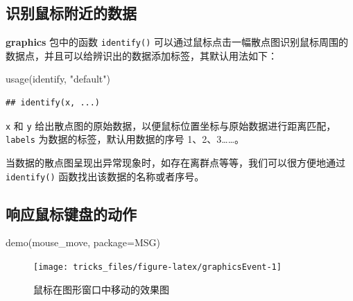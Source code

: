 \documentclass[
  b5paper,
  UTF8,twoside]{book}
\newenvironment{Shaded}{\begin{snugshade}}{\end{snugshade}}
\newcommand{\AttributeTok}[1]{\textcolor[rgb]{0.77,0.63,0.00}{#1}}
\newcommand{\FunctionTok}[1]{\textcolor[rgb]{0.00,0.00,0.00}{#1}}
\newcommand{\NormalTok}[1]{#1}
\newcommand{\StringTok}[1]{\textcolor[rgb]{0.31,0.60,0.02}{#1}}
\begin{document}
\hypertarget{ux8bc6ux522bux9f20ux6807ux9644ux8fd1ux7684ux6570ux636e}{%
\subsection{识别鼠标附近的数据}\label{ux8bc6ux522bux9f20ux6807ux9644ux8fd1ux7684ux6570ux636e}}

\textbf{graphics} 包中的函数 \texttt{identify()} 可以通过鼠标点击一幅散点图识别鼠标周围的数据点，并且可以给辨识出的数据添加标签，其默认用法如下：

\begin{Shaded}
\begin{Highlighting}[]
\FunctionTok{usage}\NormalTok{(identify, }\StringTok{"default"}\NormalTok{)}
\end{Highlighting}
\end{Shaded}

\begin{verbatim}
## identify(x, ...)
\end{verbatim}

\texttt{x} 和 \texttt{y} 给出散点图的原始数据，以便鼠标位置坐标与原始数据进行距离匹配，\texttt{labels} 为数据的标签，默认用数据的序号 1、2、3\ldots\ldots。

当数据的散点图呈现出异常现象时，如存在离群点等等，我们可以很方便地通过 \texttt{identify()} 函数找出该数据的名称或者序号。

\hypertarget{ux54cdux5e94ux9f20ux6807ux952eux76d8ux7684ux52a8ux4f5c}{%
\subsection{响应鼠标键盘的动作}\label{ux54cdux5e94ux9f20ux6807ux952eux76d8ux7684ux52a8ux4f5c}}

\begin{Shaded}
\begin{Highlighting}[]
\FunctionTok{demo}\NormalTok{(}\StringTok{\textquotesingle{}mouse\_move\textquotesingle{}}\NormalTok{, }\AttributeTok{package=}\StringTok{\textquotesingle{}MSG\textquotesingle{}}\NormalTok{)}
\end{Highlighting}
\end{Shaded}

\begin{figure}

{\centering \texttt{[image: tricks\_files/figure-latex/graphicsEvent-1]} 

}

\caption{鼠标在图形窗口中移动的效果图}\label{fig:graphicsEvent}
\end{figure}
\end{document}
